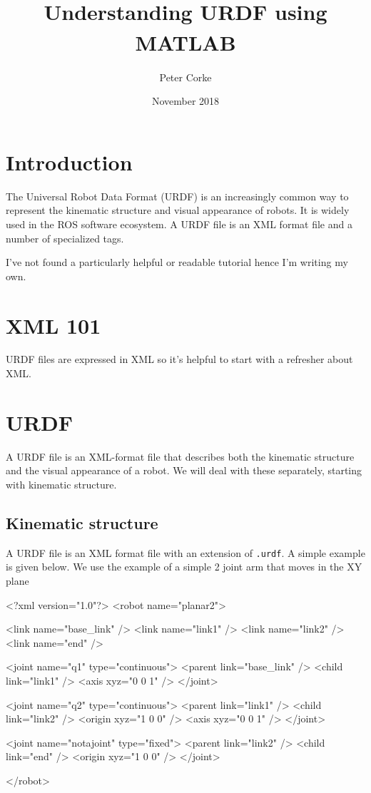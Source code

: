 \documentclass[9pt,fleqn,a4paper]{article}
\title{Understanding URDF using MATLAB\textsuperscript{\textregistered}}
\author{Peter Corke}
\date{November 2018}                                           %
\begin{document}
\maketitle

\section{Introduction}
The Universal Robot Data Format (URDF) is an increasingly common way to represent the kinematic structure and visual appearance of robots.
It is widely used in the ROS software ecosystem.
A URDF file is an XML format file and a number of specialized tags.

I've not found a particularly helpful or readable tutorial hence I'm writing my own.

\section{XML 101}
URDF files are expressed in XML so it's helpful to start with a refresher about XML.


\newpage
\section{URDF}
A URDF file is an XML-format file that describes both the kinematic structure and the visual appearance of a robot.  We will deal with these separately, starting with 
kinematic structure.  

\subsection{Kinematic structure}
A URDF file is an XML format file with an extension of \texttt{.urdf}.  A simple example is given below.
We use the example of a simple 2 joint  arm that moves in the XY plane
\begin{XMLNum}
<?xml version="1.0"?>
<robot name="planar2">
  
  <link name="base_link" />
  <link name="link1" />
  <link name="link2" />
  <link name="end" />

  <joint name="q1" type="continuous">
    <parent link="base_link" />
    <child link="link1" />
    <axis xyz="0 0 1" />
  </joint>
  
  <joint name="q2" type="continuous">
    <parent link="link1" />
    <child link="link2" />
    <origin xyz="1 0 0" />
    <axis xyz="0 0 1" />
  </joint>
  
  <joint name="notajoint" type="fixed">
    <parent link="link2" />
    <child link="end" />
    <origin xyz="1 0 0" />
  </joint>
  
</robot>
\end{XMLNum}
\end{document}
